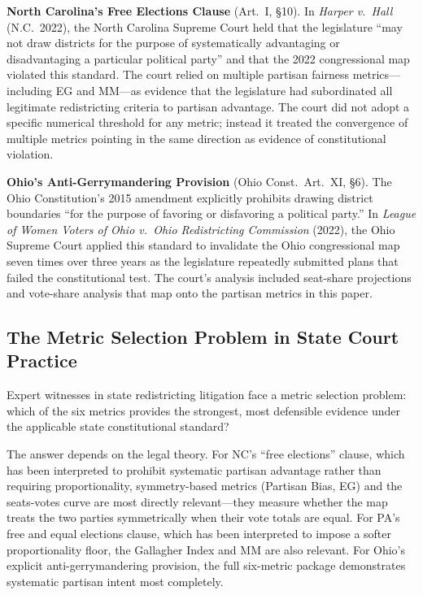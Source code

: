 \textbf{North Carolina's Free Elections Clause} (Art.\ I, \S 10). In
\textit{Harper v.\ Hall} (N.C.\ 2022), the North Carolina Supreme Court
held that the legislature ``may not draw districts for the purpose of
systematically advantaging or disadvantaging a particular political party''
and that the 2022 congressional map violated this standard. The court relied
on multiple partisan fairness metrics---including EG and MM---as evidence
that the legislature had subordinated all legitimate redistricting criteria
to partisan advantage. The court did not adopt a specific numerical threshold
for any metric; instead it treated the convergence of multiple metrics
pointing in the same direction as evidence of constitutional violation.

\textbf{Ohio's Anti-Gerrymandering Provision} (Ohio Const.\ Art.\ XI, \S 6).
The Ohio Constitution's 2015 amendment explicitly prohibits drawing district
boundaries ``for the purpose of favoring or disfavoring a political party.''
In \textit{League of Women Voters of Ohio v.\ Ohio Redistricting Commission}
(2022), the Ohio Supreme Court applied this standard to invalidate the Ohio
congressional map seven times over three years as the legislature repeatedly
submitted plans that failed the constitutional test. The court's analysis
included seat-share projections and vote-share analysis that map onto the
partisan metrics in this paper.

\subsection{The Metric Selection Problem in State Court Practice}

Expert witnesses in state redistricting litigation face a metric selection
problem: which of the six metrics provides the strongest, most defensible
evidence under the applicable state constitutional standard?

The answer depends on the legal theory. For NC's ``free elections'' clause,
which has been interpreted to prohibit systematic partisan advantage rather
than requiring proportionality, symmetry-based metrics (Partisan Bias, EG)
and the seats-votes curve are most directly relevant---they measure whether
the map treats the two parties symmetrically when their vote totals are equal.
For PA's free and equal elections clause, which has been interpreted to impose
a softer proportionality floor, the Gallagher Index and MM are also relevant.
For Ohio's explicit anti-gerrymandering provision, the full six-metric package
demonstrates systematic partisan intent most completely.

